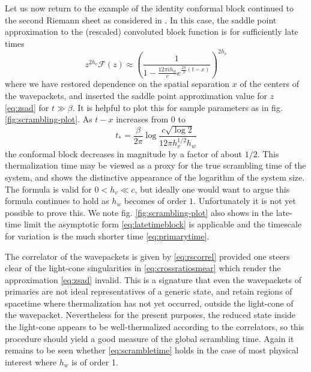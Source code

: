 \documentclass{brownthesis}
\begin{document}
Let us now return to the example of the identity conformal block continued
to the second Riemann sheet as considered in \cite{PhysRevLett.115.131603}.
In this case, the saddle point approximation to the (rescaled) convoluted
block function is for sufficiently late times
\begin{equation}
z^{2h_{v}}\mathcal{F}(z)\approx\left(\frac{1}{1-\frac{12\pi ih_{w}}{c}e^{\frac{2\pi}{\beta}(t-x)}}\right)^{2h_{v}}\label{eq:rscorrel}
\end{equation}
where we have restored dependence on the spatial separation $x$ of
the centers of the wavepackets, and inserted the saddle point approximation
value for $z$ \eqref{eq:zsad} for $t\gg\beta$. It is helpful to
plot this for sample parameters as in fig. \ref{fig:scrambling-plot}.
As $t-x$ increases from $0$ to
\begin{equation}
t_{*}=\frac{\beta}{2\pi}\log\frac{c\sqrt{\log2}}{12\pi h_{v}^{1/2}h_{w}}\label{eq:scrambletime}
\end{equation}
the conformal block decreases in magnitude by a factor of about $1/2$.
This thermalization time may be viewed as a proxy for the true scrambling
time of the system, and shows the distinctive appearance of the logarithm
of the system size. The formula is valid for $0<h_{v}\ll c$, but
ideally one would want to argue this formula continues to hold as
$h_{w}$ becomes of order $1$. Unfortunately it is not yet possible
to prove this. We note fig. \ref{fig:scrambling-plot} also shows
in the late-time limit the asymptotic form \eqref{eq:latetimeblock}
is applicable and the timescale for variation is the much shorter
time \eqref{eq:primarytime}.

The correlator of the wavepackets is given by \eqref{eq:rscorrel}
provided one steers clear of the light-cone singularities in \eqref{eq:crossratiosmear}
which render the approximation \eqref{eq:zsad} invalid. This is a
signature that even the wavepackets of primaries are not ideal representatives
of a generic state, and retain regions of spacetime where thermalization
has not yet occurred, outside the light-cone of the wavepacket. Nevertheless
for the present purposes, the reduced state inside the light-cone
appears to be well-thermalized according to the correlators, so this
procedure should yield a good measure of the global scrambling time.
Again it remains to be seen whether \eqref{eq:scrambletime} holds
in the case of most physical interest where $h_{w}$ is of order 1.
\end{document}
